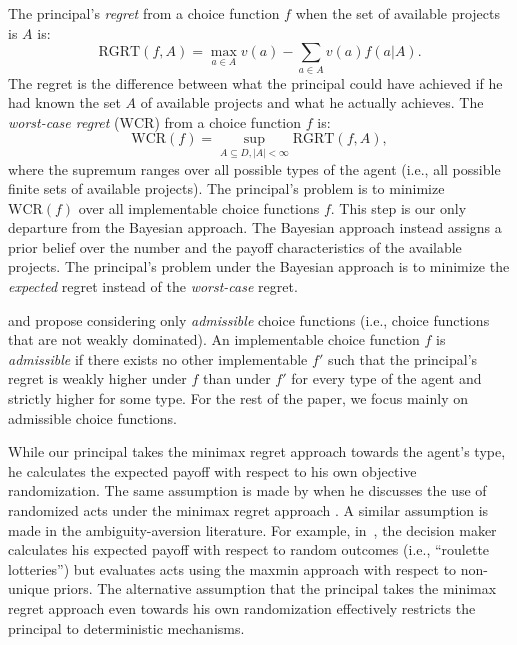 \documentclass[12pt,english]{article}
\theoremstyle{remark}
\theoremstyle{plain}
\theoremstyle{definition}
\newcommand{\rgrt}{\mathrm{RGRT}}
\newcommand{\wcr}{\mathrm{WCR}}
\begin{document}
The principal's \emph{regret} from a choice function $f$ when the set of available projects is $A$ is:
\[
\rgrt(f,A)=\max_{a \in A}v(a)-\sum_{a\in A}v(a)f(a|A).
\]
The regret is the difference between what the principal could have achieved if he had known the set $A$ of available projects and what he actually achieves. The \emph{worst-case regret} ($\wcr$) from a choice function $f$ is:
\[
\wcr(f)=\sup_{A\subseteq D, |A|<\infty  }\rgrt(f,A),
\]
where the supremum ranges over all possible types of the agent (i.e., all possible finite sets of available projects). The principal's problem is to minimize $\wcr(f)$ over all implementable choice functions $f$. This step is our only departure from the Bayesian approach. The Bayesian approach instead assigns a prior belief over the number and the payoff characteristics of the available projects. The principal's problem under the Bayesian approach is to minimize the \emph{expected} regret instead of the \emph{worst-case} regret.



\cite{Wald1950} and \cite{Savage1972} propose considering only \emph{admissible} choice functions (i.e., choice functions that are not weakly dominated). An implementable choice function $f$ is \emph{admissible} if there exists no other implementable $f'$ such that the principal's regret is weakly higher under $f$ than under $f'$ for every type of the agent and strictly higher for some type. For the rest of the paper, we focus mainly on admissible choice functions. 

While our principal takes the minimax regret approach towards the agent's type, he calculates the expected payoff with respect to his own objective randomization. The same assumption is made by \cite{Savage1972} when he discusses the use of randomized acts under the minimax regret approach \cite[chapter~9.3]{Savage1972}. A similar assumption is made in the ambiguity-aversion literature. For example, in~\cite{Gilboa1989}, the decision maker calculates his expected payoff with respect to random outcomes (i.e., ``roulette lotteries'') but evaluates acts using the maxmin approach with respect to non-unique priors. %
The alternative assumption that the principal takes the minimax regret approach even towards his own randomization effectively restricts the principal to deterministic mechanisms. 
\end{document}
